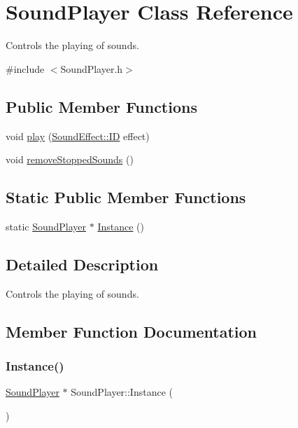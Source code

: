 \hypertarget{class_sound_player}{}\section{Sound\+Player Class Reference}
\label{class_sound_player}


Controls the playing of sounds.  




{\ttfamily \#include $<$Sound\+Player.\+h$>$}

\subsection*{Public Member Functions}
\begin{DoxyCompactItemize}
\item 
void \hyperlink{class_sound_player_aa0b85f15f5b13bc41c71eeee6b0a7779}{play} (\hyperlink{namespace_sound_effect_a11ffbf1eb89e85a34cbfd5a59b2cd9cb}{Sound\+Effect\+::\+ID} effect)
\item 
void \hyperlink{class_sound_player_a3fd165dadf60b580b16367b81d84681b}{remove\+Stopped\+Sounds} ()
\end{DoxyCompactItemize}
\subsection*{Static Public Member Functions}
\begin{DoxyCompactItemize}
\item 
static \hyperlink{class_sound_player}{Sound\+Player} $\ast$ \hyperlink{class_sound_player_a4458c33c6054f60a9cd70cdbb2d1cdb0}{Instance} ()
\end{DoxyCompactItemize}


\subsection{Detailed Description}
Controls the playing of sounds. 



\subsection{Member Function Documentation}
\mbox{\label{class_sound_player_a4458c33c6054f60a9cd70cdbb2d1cdb0}} 
\subsubsection{\texorpdfstring{Instance()}{Instance()}}
{\footnotesize\ttfamily \hyperlink{class_sound_player}{Sound\+Player} $\ast$ Sound\+Player\+::\+Instance (\begin{DoxyParamCaption}{ }\end{DoxyParamCaption})\hspace{0.3cm}{\ttfamily [static]}}

